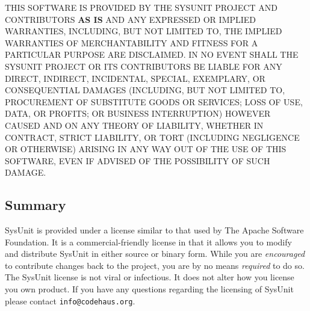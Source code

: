 THIS SOFTWARE IS PROVIDED BY THE SYSUNIT PROJECT AND CONTRIBUTORS
\textbf{AS IS} AND ANY EXPRESSED OR IMPLIED WARRANTIES, INCLUDING, BUT
NOT LIMITED TO, THE IMPLIED WARRANTIES OF MERCHANTABILITY AND
FITNESS FOR A PARTICULAR PURPOSE ARE DISCLAIMED.  IN NO EVENT SHALL
THE SYSUNIT PROJECT OR ITS CONTRIBUTORS BE LIABLE FOR ANY DIRECT,
INDIRECT, INCIDENTAL, SPECIAL, EXEMPLARY, OR CONSEQUENTIAL DAMAGES
(INCLUDING, BUT NOT LIMITED TO, PROCUREMENT OF SUBSTITUTE GOODS OR
SERVICES; LOSS OF USE, DATA, OR PROFITS; OR BUSINESS INTERRUPTION)
HOWEVER CAUSED AND ON ANY THEORY OF LIABILITY, WHETHER IN CONTRACT,
STRICT LIABILITY, OR TORT (INCLUDING NEGLIGENCE OR OTHERWISE)
ARISING IN ANY WAY OUT OF THE USE OF THIS SOFTWARE, EVEN IF ADVISED
OF THE POSSIBILITY OF SUCH DAMAGE.

\normalsize

\subsection{Summary}

SysUnit is provided under a license similar to that used by
The Apache Software Foundation.  It is a commercial-friendly license
in that it allows you to modify and distribute SysUnit in either
source or binary form.  While you are \emph{encouraged} to contribute
changes back to the project, you are by no means \emph{required} to
do so.   The SysUnit license is not viral or infectious.  It
does not alter how you license you own product.  If you have any
questions regarding the licensing of SysUnit please contact
\verb|info@codehaus.org|.
